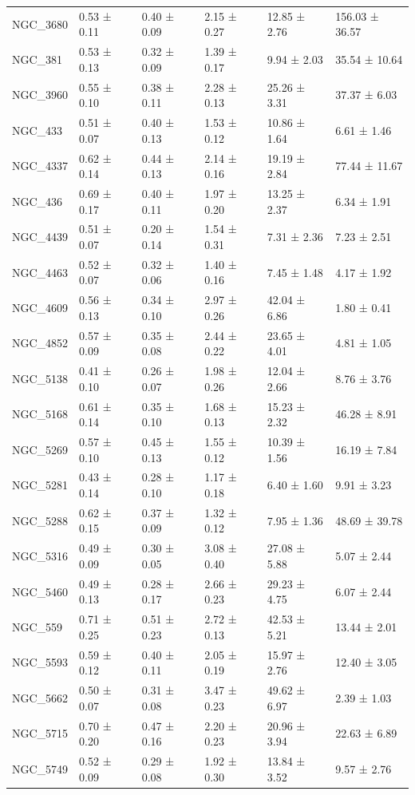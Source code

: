 \begin{tabular}{llllll}
NGC_3680 & 0.53 ± 0.11 & 0.40 ± 0.09 & 2.15 ± 0.27 & 12.85 ± 2.76 & 156.03 ± 36.57 \\
NGC_381 & 0.53 ± 0.13 & 0.32 ± 0.09 & 1.39 ± 0.17 & 9.94 ± 2.03 & 35.54 ± 10.64 \\
NGC_3960 & 0.55 ± 0.10 & 0.38 ± 0.11 & 2.28 ± 0.13 & 25.26 ± 3.31 & 37.37 ± 6.03 \\
NGC_433 & 0.51 ± 0.07 & 0.40 ± 0.13 & 1.53 ± 0.12 & 10.86 ± 1.64 & 6.61 ± 1.46 \\
NGC_4337 & 0.62 ± 0.14 & 0.44 ± 0.13 & 2.14 ± 0.16 & 19.19 ± 2.84 & 77.44 ± 11.67 \\
NGC_436 & 0.69 ± 0.17 & 0.40 ± 0.11 & 1.97 ± 0.20 & 13.25 ± 2.37 & 6.34 ± 1.91 \\
NGC_4439 & 0.51 ± 0.07 & 0.20 ± 0.14 & 1.54 ± 0.31 & 7.31 ± 2.36 & 7.23 ± 2.51 \\
NGC_4463 & 0.52 ± 0.07 & 0.32 ± 0.06 & 1.40 ± 0.16 & 7.45 ± 1.48 & 4.17 ± 1.92 \\
NGC_4609 & 0.56 ± 0.13 & 0.34 ± 0.10 & 2.97 ± 0.26 & 42.04 ± 6.86 & 1.80 ± 0.41 \\
NGC_4852 & 0.57 ± 0.09 & 0.35 ± 0.08 & 2.44 ± 0.22 & 23.65 ± 4.01 & 4.81 ± 1.05 \\
NGC_5138 & 0.41 ± 0.10 & 0.26 ± 0.07 & 1.98 ± 0.26 & 12.04 ± 2.66 & 8.76 ± 3.76 \\
NGC_5168 & 0.61 ± 0.14 & 0.35 ± 0.10 & 1.68 ± 0.13 & 15.23 ± 2.32 & 46.28 ± 8.91 \\
NGC_5269 & 0.57 ± 0.10 & 0.45 ± 0.13 & 1.55 ± 0.12 & 10.39 ± 1.56 & 16.19 ± 7.84 \\
NGC_5281 & 0.43 ± 0.14 & 0.28 ± 0.10 & 1.17 ± 0.18 & 6.40 ± 1.60 & 9.91 ± 3.23 \\
NGC_5288 & 0.62 ± 0.15 & 0.37 ± 0.09 & 1.32 ± 0.12 & 7.95 ± 1.36 & 48.69 ± 39.78 \\
NGC_5316 & 0.49 ± 0.09 & 0.30 ± 0.05 & 3.08 ± 0.40 & 27.08 ± 5.88 & 5.07 ± 2.44 \\
NGC_5460 & 0.49 ± 0.13 & 0.28 ± 0.17 & 2.66 ± 0.23 & 29.23 ± 4.75 & 6.07 ± 2.44 \\
NGC_559 & 0.71 ± 0.25 & 0.51 ± 0.23 & 2.72 ± 0.13 & 42.53 ± 5.21 & 13.44 ± 2.01 \\
NGC_5593 & 0.59 ± 0.12 & 0.40 ± 0.11 & 2.05 ± 0.19 & 15.97 ± 2.76 & 12.40 ± 3.05 \\
NGC_5662 & 0.50 ± 0.07 & 0.31 ± 0.08 & 3.47 ± 0.23 & 49.62 ± 6.97 & 2.39 ± 1.03 \\
NGC_5715 & 0.70 ± 0.20 & 0.47 ± 0.16 & 2.20 ± 0.23 & 20.96 ± 3.94 & 22.63 ± 6.89 \\
NGC_5749 & 0.52 ± 0.09 & 0.29 ± 0.08 & 1.92 ± 0.30 & 13.84 ± 3.52 & 9.57 ± 2.76 \\

\end{tabular}
